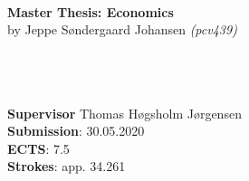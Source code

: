 \documentclass[12pt,oneside]{article}
\begin{document}

    \thispagestyle{empty}
    \vspace*{3.75cm}
    \textbf{\large\\ Master Thesis: Economics}\\
    \vspace*{0.1cm}
    by Jeppe Søndergaard Johansen \textit{(pcv439)} \hspace{1.0cm}
    \vspace*{2.75cm}\\
    \textbf{\LARGE } \\
    \vspace*{0.1cm} \\
    \begin{tabbing}
    \\[7.55cm]
    \textbf{Supervisor} Thomas Høgsholm Jørgensen \\
    \textbf{Submission}: 30.05.2020\\
    \textbf{ECTS}: 7.5\\
    \textbf{Strokes}: app. 34.261\\
    \end{tabbing}
    \newpage
    \ClearWallPaper
\end{document}
